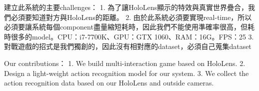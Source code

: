 建立此系統的主要challenges：
1. 為了讓HoloLens顯示的特效與真實世界疊合，我們必須要知道對方與HoloLens的距離。
2. 由於此系統必須要實現real-time，所以必須要讓系統每個component盡量縮短耗時，因此我們不能使用準確率很高，但耗時很多的model。CPU：i7-7700K、GPU：GTX 1060、RAM：16G。FPS：25
3. 對戰遊戲的招式是我們獨創的，因此沒有相對應的dataset，必須自己蒐集dataset

Our contributions：
1. We build multi-interaction game based on HoloLens.
2. Design a light-weight action recognition model for our system.
3. We collect the action recognition data based on our HoloLens and outside cameras.

\EndChapter
